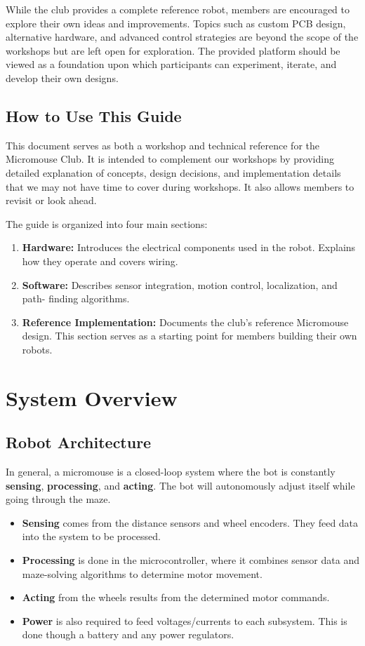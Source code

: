 \documentclass[11pt]{report}
\begin{document}
	\noindent
	While the club provides a complete reference robot, members are encouraged to explore their own 
	ideas and improvements. Topics such as custom PCB design, alternative hardware, and advanced 
	control strategies are beyond the scope of the workshops but are left open for exploration. 
	The provided platform should be viewed as a foundation upon which participants can experiment, 
	iterate, and develop their own designs.

    \section{How to Use This Guide}
	This document serves as both a workshop and technical reference for the Micromouse Club. It is 
	intended to complement our workshops by providing detailed explanation of concepts, design decisions, 
	and implementation details that we may not have time to cover during workshops. It also allows 
	members to revisit or look ahead. 
	\newline

	\noindent
	The guide is organized into four main sections:
	\begin{enumerate}
		\item \textbf{Hardware:} Introduces the electrical components used in the robot. Explains how
				they operate and covers wiring.
		\item \textbf{Software:} Describes sensor integration, motion control, localization, and path-
				finding algorithms. 
		\item \textbf{Reference Implementation:} Documents the club's reference Micromouse design. This
				section serves as a starting point for members building their own robots.
	\end{enumerate}

\chapter{System Overview} \label{ch:system_overview}
    \section{Robot Architecture}
	In general, a micromouse is a closed-loop system where the bot is constantly \textbf{sensing}, 
	\textbf{processing}, and \textbf{acting}. The bot will autonomously adjust itself while going 
	through the maze.
	\begin{itemize}
		\item \textbf{Sensing} comes from the distance sensors and wheel encoders. They feed data into 
			the system to be processed.
		\item \textbf{Processing} is done in the microcontroller, where it combines sensor data and 
			maze-solving algorithms to determine motor movement.
		\item \textbf{Acting} from the wheels results from the determined motor commands.
		\item \textbf{Power} is also required to feed voltages/currents to each subsystem. This is done 
			though a battery and any power regulators.  
	\end{itemize}
\end{document}
